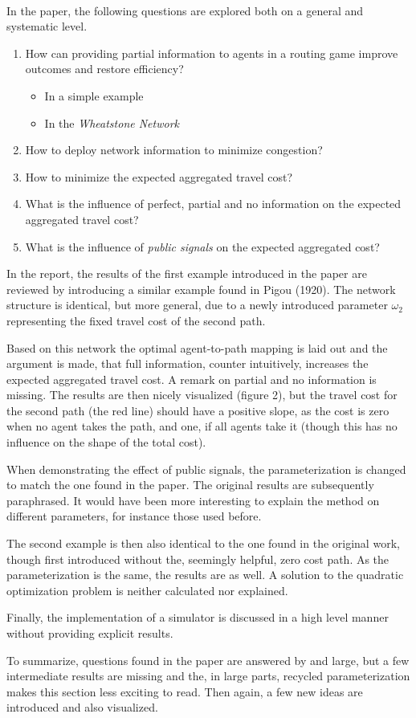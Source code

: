 \documentclass[../review.tex]{subfiles}
\begin{document}
 \textcolor{green}{\Large\checkmark}\\
In the paper, the following questions are explored both on a general and systematic level.
\begin{enumerate}
  \item How can providing partial information to agents in a routing game improve outcomes and restore efficiency?
  \begin{itemize}
    \item In a simple example
    \item In the \textit{Wheatstone Network}
  \end{itemize}
  \item How to deploy network information to minimize congestion?
  \item How to minimize the expected aggregated travel cost?
  \item What is the influence of perfect, partial and no information on the expected aggregated travel cost?
  \item What is the influence of \textit{public signals} on the expected aggregated cost?
\end{enumerate}
In the report, the results of the first example introduced in the paper are reviewed by introducing a similar example found in Pigou (1920). The network structure is identical, but more general, due to a newly introduced parameter $\omega_2$ representing the fixed travel cost of the second path.

Based on this network the optimal agent-to-path mapping is laid out and the argument is made, that full information, counter intuitively, increases the expected aggregated travel cost. A remark on partial and no information is missing. The results are then nicely visualized (figure 2), but the travel cost for the second path (the red line) should have a positive slope, as the cost is zero when no agent takes the path, and one, if all agents take it (though this has no influence on the shape of the total cost).

When demonstrating the effect of public signals, the parameterization is changed to match the one found in the paper. The original results are subsequently paraphrased. It would have been more interesting to explain the method on different parameters, for instance those used before.

The second example is then also identical to the one found in the original work, though first introduced without the, seemingly helpful, zero cost path. As the parameterization is the same, the results are as well. A solution to the quadratic optimization problem is neither calculated nor explained.

Finally, the implementation of a simulator is discussed in a high level manner without providing explicit results.

To summarize, questions found in the paper are answered by and large, but a few intermediate results are missing and the, in large parts, recycled parameterization makes this section less exciting to read. Then again, a few new ideas are introduced and also visualized.
\end{document}
